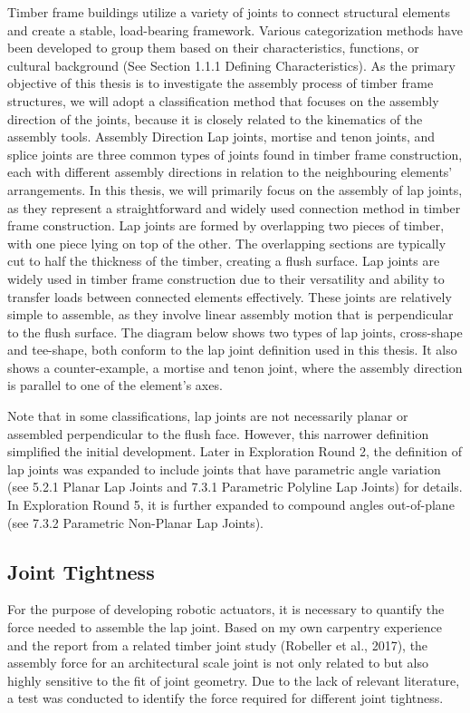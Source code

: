 Timber frame buildings utilize a variety of joints to connect structural elements and create a stable, load-bearing framework. Various categorization methods have been developed to group them based on their characteristics, functions, or cultural background (See Section 1.1.1 Defining Characteristics). As the primary objective of this thesis is to investigate the assembly process of timber frame structures, we will adopt a classification method that focuses on the assembly direction of the joints, because it is closely related to the kinematics of the assembly tools.
Assembly Direction
Lap joints, mortise and tenon joints, and splice joints are three common types of joints found in timber frame construction, each with different assembly directions in relation to the neighbouring elements' arrangements. In this thesis, we will primarily focus on the assembly of lap joints, as they represent a straightforward and widely used connection method in timber frame construction. 
Lap joints are formed by overlapping two pieces of timber, with one piece lying on top of the other. The overlapping sections are typically cut to half the thickness of the timber, creating a flush surface. Lap joints are widely used in timber frame construction due to their versatility and ability to transfer loads between connected elements effectively. These joints are relatively simple to assemble, as they involve linear assembly motion that is perpendicular to the flush surface. 
The diagram below shows two types of lap joints, cross-shape and tee-shape, both conform to the lap joint definition used in this thesis. It also shows a counter-example, a mortise and tenon joint, where the assembly direction is parallel to one of the element’s axes. 


Note that in some classifications, lap joints are not necessarily planar or assembled perpendicular to the flush face. However, this narrower definition simplified the initial development. Later in Exploration Round 2, the definition of lap joints was expanded to include joints that have parametric angle variation (see 5.2.1 Planar Lap Joints and 7.3.1 Parametric Polyline Lap Joints) for details. In Exploration Round 5, it is further expanded to compound angles out-of-plane (see 7.3.2 Parametric Non-Planar Lap Joints). 
\subsection{Joint Tightness}
\label{subsection:exploration_1_joint_tightness}

For the purpose of developing robotic actuators, it is necessary to quantify the force needed to assemble the lap joint. Based on my own carpentry experience and the report from a related timber joint study (Robeller et al., 2017), the assembly force for an architectural scale joint is not only related to but also highly sensitive to the fit of joint geometry. 
Due to the lack of relevant literature, a test was conducted to identify the force required for different joint tightness.

